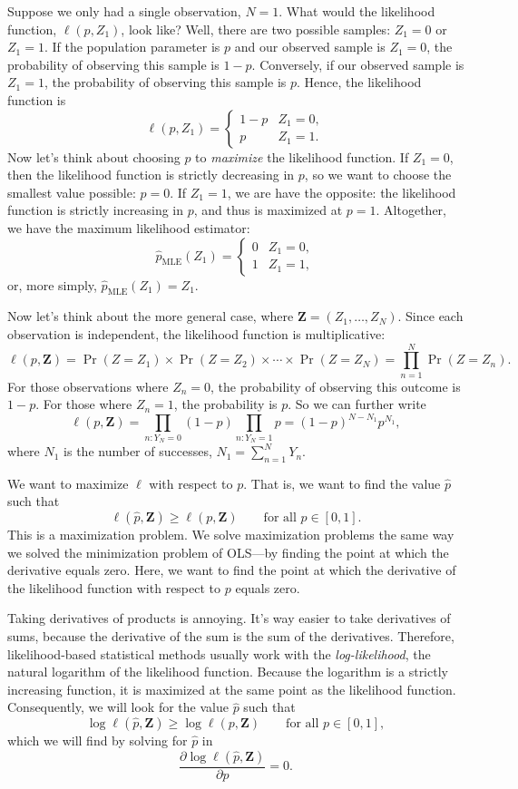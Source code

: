 \documentclass[
  12pt,
  oneside,openany]{book}
\begin{document}
Suppose we only had a single observation, \(N = 1\).
What would the likelihood function, \(\ell(p, Z_1)\), look like?
Well, there are two possible samples: \(Z_1 = 0\) or \(Z_1 = 1\).
If the population parameter is \(p\) and our observed sample is \(Z_1 = 0\), the probability of observing this sample is \(1 - p\).
Conversely, if our observed sample is \(Z_1 = 1\), the probability of observing this sample is \(p\).
Hence, the likelihood function is
\[
\ell(p, Z_1) = \begin{cases}
1 - p & Z_1 = 0, \\
p & Z_1 = 1.
\end{cases}
\]
Now let's think about choosing \(p\) to \emph{maximize} the likelihood function.
If \(Z_1 = 0\), then the likelihood function is strictly decreasing in \(p\), so we want to choose the smallest value possible: \(p = 0\).
If \(Z_1 = 1\), we are have the opposite: the likelihood function is strictly increasing in \(p\), and thus is maximized at \(p = 1\).
Altogether, we have the maximum likelihood estimator:
\[
\hat{p}_{\text{MLE}}(Z_1) = \begin{cases}
0 & Z_1 = 0, \\
1 & Z_1 = 1,
\end{cases}
\]
or, more simply, \(\hat{p}_{\text{MLE}}(Z_1) = Z_1\).

Now let's think about the more general case, where \(\mathbf{Z} = (Z_1, \ldots, Z_N)\).
Since each observation is independent, the likelihood function is multiplicative:
\[
\ell(p, \mathbf{Z})
= \Pr(Z = Z_1) \times \Pr(Z = Z_2) \times \cdots \times \Pr(Z = Z_N)
= \prod_{n=1}^N \Pr(Z = Z_n).
\]
For those observations where \(Z_n = 0\), the probability of observing this outcome is \(1 - p\).
For those where \(Z_n = 1\), the probability is \(p\).
So we can further write
\[
\ell(p, \mathbf{Z})
= \prod_{n : Y_N = 0} (1 - p) \prod_{n : Y_N = 1} p
= (1 - p)^{N - N_1} p^{N_1},
\]
where \(N_1\) is the number of successes, \(N_1 = \sum_{n=1}^N Y_n\).

We want to maximize \(\ell\) with respect to \(p\).
That is, we want to find the value \(\hat{p}\) such that
\[
\ell(\hat{p}, \mathbf{Z}) \geq \ell(p, \mathbf{Z}) \qquad \text{for all $p \in [0, 1]$.}
\]
This is a maximization problem.
We solve maximization problems the same way we solved the minimization problem of OLS---by finding the point at which the derivative equals zero.
Here, we want to find the point at which the derivative of the likelihood function with respect to \(p\) equals zero.

Taking derivatives of products is annoying.
It's way easier to take derivatives of sums, because the derivative of the sum is the sum of the derivatives.
Therefore, likelihood-based statistical methods usually work with the \emph{log-likelihood}, the natural logarithm of the likelihood function.
Because the logarithm is a strictly increasing function, it is maximized at the same point as the likelihood function.
Consequently, we will look for the value \(\hat{p}\) such that
\[
\log \ell(\hat{p}, \mathbf{Z}) \geq \log \ell(p, \mathbf{Z}) \qquad \text{for all $p \in [0, 1]$},
\]
which we will find by solving for \(\hat{p}\) in
\[
\frac{\partial \log \ell(\hat{p}, \mathbf{Z})}{\partial p} = 0.
\]
\end{document}

